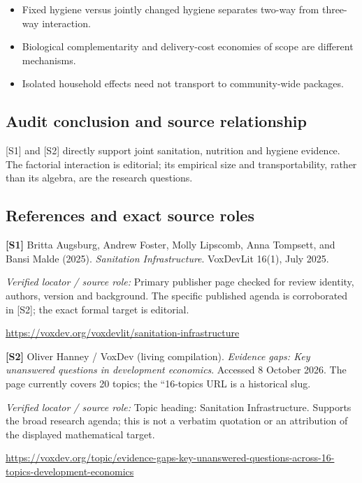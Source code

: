 \documentclass[11pt,a4paper]{article}
\begin{document}
\begin{itemize}
\item Fixed hygiene versus jointly changed hygiene separates two-way from three-way interaction.
\item Biological complementarity and delivery-cost economies of scope are different mechanisms.
\item Isolated household effects need not transport to community-wide packages.
\end{itemize}

\subsection*{Audit conclusion and source relationship}

[S1] and [S2] directly support joint sanitation, nutrition and hygiene evidence. The factorial interaction is editorial; its empirical size and transportability, rather than its algebra, are the research questions.

\subsection*{References and exact source roles}

{\footnotesize\raggedright
\par\noindent\textbf{[S1]} Britta Augsburg, Andrew Foster, Molly Lipscomb, Anna Tompsett, and Bansi Malde (2025). \emph{Sanitation Infrastructure}. VoxDevLit 16(1), July 2025.\par \textit{Verified locator / source role:} Primary publisher page checked for review identity, authors, version and background. The specific published agenda is corroborated in [S2]; the exact formal target is editorial.\par \url{https://voxdev.org/voxdevlit/sanitation-infrastructure}\par\smallskip
\par\noindent\textbf{[S2]} Oliver Hanney / VoxDev (living compilation). \emph{Evidence gaps: Key unanswered questions in development economics}. Accessed 8 October 2026. The page currently covers 20 topics; the ``16-topics URL is a historical slug.\par \textit{Verified locator / source role:} Topic heading: Sanitation Infrastructure. Supports the broad research agenda; this is not a verbatim quotation or an attribution of the displayed mathematical target.\par \url{https://voxdev.org/topic/evidence-gaps-key-unanswered-questions-across-16-topics-development-economics}\par\smallskip
}
\end{document}
